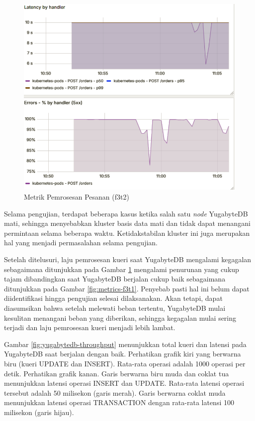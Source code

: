 \begin{figure}[H]
    \centering
    \includegraphics[width=1\textwidth]{resources/chapter-4/latensi-yugabyte-fail.png}
    \caption{Metrik Pemrosesan Pesanan (f3t2)}
    \label{fig:metrics-f3t2}
\end{figure}

Selama pengujian, terdapat beberapa kasus ketika salah satu \textit{node} YugabyteDB mati, sehingga menyebabkan kluster basis data mati dan tidak dapat menangani permintaan selama beberapa waktu. Ketidakstabilan kluster ini juga merupakan hal yang menjadi permasalahan selama pengujian.

Setelah ditelusuri, laju pemrosesan kueri saat YugabyteDB mengalami kegagalan sebagaimana ditunjukkan pada Gambar \ref{fig:metrics-f3t2} mengalami penurunan yang cukup tajam dibandingkan saat YugabyteDB berjalan cukup baik sebagaimana ditunjukkan pada Gambar \ref{fig:metrics-f3t1}. Penyebab pasti hal ini belum dapat diidentifikasi hingga pengujian selesai dilaksanakan. Akan tetapi, dapat diasumsikan bahwa setelah melewati beban tertentu, YugabyteDB mulai kesulitan menangani beban yang diberikan, sehingga kegagalan mulai sering terjadi dan laju pemrosesan kueri menjadi lebih lambat.

Gambar \ref{fig:yugabytedb-throughput} menunjukkan total kueri dan latensi pada YugabyteDB saat berjalan dengan baik. Perhatikan grafik kiri yang berwarna biru (kueri UPDATE dan INSERT). Rata-rata operasi adalah 1000 operasi per detik. Perhatikan grafik kanan. Garis berwarna biru muda dan coklat tua menunjukkan latensi operasi INSERT dan UPDATE. Rata-rata latensi operasi tersebut adalah 50 milisekon (garis merah). Garis berwarna coklat muda menunjukkan latensi operasi TRANSACTION dengan rata-rata latensi 100 milisekon (garis hijau).

